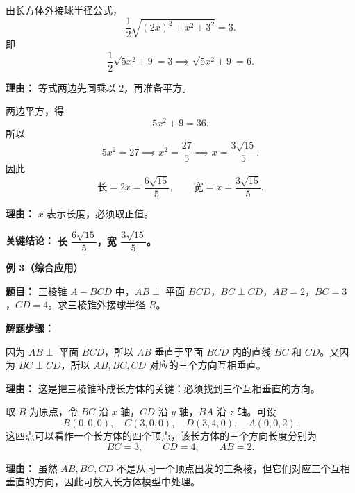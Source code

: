 \begin{examplebox}
\begin{description}[style=nextline, leftmargin=2.8em, labelsep=0.5em, itemsep=0.45em]
		\item[\textbf{第三步（代入半径公式列方程）：}] 由长方体外接球半径公式，
		      \[
			      \frac{1}{2}\sqrt{(2x)^2+x^2+3^2}=3.
		      \]
		      即
		      \[
			      \frac{1}{2}\sqrt{5x^2+9}=3
			      \implies
			      \sqrt{5x^2+9}=6.
		      \]
		      \par\textbf{理由：}
		      等式两边先同乘以 $2$，再准备平方。

		\item[\textbf{第四步（解方程求 $x$）：}] 两边平方，得
		      \[
			      5x^2+9=36.
		      \]
		      所以
		      \[
			      5x^2=27
			      \implies
			      x^2=\frac{27}{5}
			      \implies
			      x=\frac{3\sqrt{15}}{5}.
		      \]
		      因此
		      \[
			      \text{长}=2x=\frac{6\sqrt{15}}{5},
			      \qquad
			      \text{宽}=x=\frac{3\sqrt{15}}{5}.
		      \]
		      \par\textbf{理由：}
		      $x$ 表示长度，必须取正值。
	\end{description}

	\textbf{\textcolor{CExample}{关键结论：}} \textbf{长 $\dfrac{6\sqrt{15}}{5}$，宽 $\dfrac{3\sqrt{15}}{5}$。}

	\medskip
	\textbf{\textcolor{CExample}{例 3（综合应用）}}

	\textbf{\textcolor{CExample}{题目：}} 三棱锥 $A-BCD$ 中，$AB\perp$ 平面 $BCD$，$BC\perp CD$，$AB=2$，$BC=3$，$CD=4$。求三棱锥外接球半径 $R$。

	\textbf{\textcolor{CExample}{解题步骤：}}
	\begin{description}[style=nextline, leftmargin=2.8em, labelsep=0.5em, itemsep=0.45em]
		\item[\textbf{第一步（识别垂直结构）：}]
		      因为 $AB\perp$ 平面 $BCD$，所以 $AB$ 垂直于平面 $BCD$ 内的直线 $BC$ 和 $CD$。又因为 $BC\perp CD$，所以 $AB,BC,CD$ 对应的三个方向互相垂直。

		      \par\textbf{理由：}
		      这是把三棱锥补成长方体的关键：必须找到三个互相垂直的方向。

		\item[\textbf{第二步（坐标化补形）：}]
		      取 $B$ 为原点，令 $BC$ 沿 $x$ 轴，$CD$ 沿 $y$ 轴，$BA$ 沿 $z$ 轴。可设
		      \[
			      B(0,0,0),\quad C(3,0,0),\quad D(3,4,0),\quad A(0,0,2).
		      \]
		      这四点可以看作一个长方体的四个顶点，该长方体的三个方向长度分别为
		      \[
			      BC=3,\qquad CD=4,\qquad AB=2.
		      \]

		      \par\textbf{理由：}
		      虽然 $AB,BC,CD$ 不是从同一个顶点出发的三条棱，但它们对应三个互相垂直的方向，因此可放入长方体模型中处理。


\end{description}
\end{examplebox}
